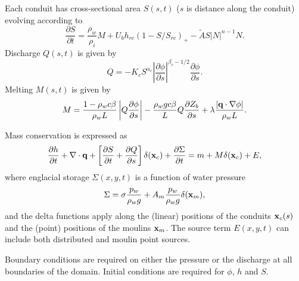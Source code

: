 \documentclass[a4paper,11pt,fleqn]{article}
\newcommand{\be}{\begin{equation} }
\newcommand{\ee}{\end{equation}}
\newcommand{\pd}[2]{\frac{\partial #1}{\partial #2}}
\newcommand{\bo}[1]{\mbox{\bf #1}}
\begin{document}
{{Each conduit has cross-sectional area $S(s,t)$ ($s$ is distance along the conduit) evolving according to 
\be
\pd{S}{t} = \frac{\rho_w}{\rho_i} M +  U_b h_{rc} (1 - S/S_{rc})_+ - \tilde{A} S |N|^{n-1}N .
\ee
Discharge $Q(s,t)$ is given by
\be
Q = -K_c S^{\alpha_c} \left|\pd{\phi}{s}\right|^{\beta_c-1/2} \pd{\phi}{s}.
\ee
Melting $M(s,t)$ is given by
\be
M =  \frac{1-\rho_w c \beta}{\rho_w L} \left|Q \pd{\phi}{s}\right| - \frac{\rho_w g c \beta}{L} Q \pd{Z_b}{s} + \lambda \frac{|\bo{q} \cdot \nabla \phi |}{\rho_w L}.
\ee

Mass conservation is expressed as
\be
\pd{h}{t} + \nabla \cdot \bo{q} + \left[ \pd{S}{t} + \pd{Q}{s} \right] \delta(\bo{x}_c) + \pd{\Sigma}{t} = m + M \delta(\bo{x}_c) + E,
\ee
where englacial storage $\Sigma(x,y,t)$ is a function of water pressure 
\be
\Sigma = \sigma\frac{p_w}{\rho_w g} + A_m \frac{p_w}{\rho_w g}\delta(\bo{x}_m),
\ee
and the delta functions apply along the (linear) positions of the conduits $\bo{x}_c(s)$ and the (point) positions of the moulins $\bo{x}_m$.  The source term $E(x,y,t)$ can include both distributed and moulin point sources.

Boundary conditions are required on either the pressure or the discharge at all boundaries of the domain.  Initial conditions are required for $\phi$, $h$ and $S$.

}}
\end{document}
